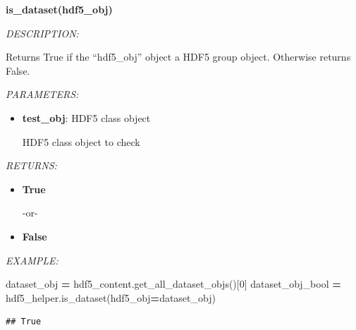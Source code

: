 \documentclass[
]{article}
\newenvironment{Shaded}{\begin{snugshade}}{\end{snugshade}}
\newcommand{\DecValTok}[1]{\textcolor[rgb]{0.00,0.00,0.81}{#1}}
\newcommand{\NormalTok}[1]{#1}
\newcommand{\OperatorTok}[1]{\textcolor[rgb]{0.81,0.36,0.00}{\textbf{#1}}}
\begin{document}
\textbf{is\_dataset(hdf5\_obj)}

\emph{DESCRIPTION:}

Returns True if the ``hdf5\_obj'' object a HDF5 group object. Otherwise returns False.

\emph{PARAMETERS:}

\begin{itemize}
\item
  \textbf{test\_obj}: HDF5 class object

  HDF5 class object to check
\end{itemize}

\emph{RETURNS:}

\begin{itemize}
\item
  \textbf{True}

  -or-
\item
  \textbf{False}
\end{itemize}

\emph{EXAMPLE:}

\begin{Shaded}
\begin{Highlighting}[]
\NormalTok{dataset_obj }\OperatorTok{=}\NormalTok{ hdf5_content.get_all_dataset_objs()[}\DecValTok{0}\NormalTok{]}
\NormalTok{dataset_obj_bool }\OperatorTok{=}\NormalTok{ hdf5_helper.is_dataset(hdf5_obj}\OperatorTok{=}\NormalTok{dataset_obj)}
\end{Highlighting}
\end{Shaded}

\begin{verbatim}
## True
\end{verbatim}
\end{document}
